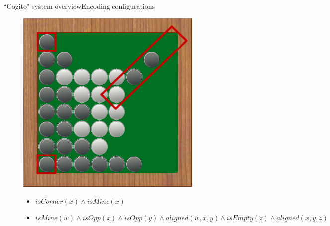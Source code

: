 \begin{frame}{``Cogito" system overview}{Encoding configurations}
\begin{figure}[ht]
  \begin{minipage}[t]{0.4\linewidth}
    \vspace{0pt}
    \centering
    \includegraphics[width=0.8\textwidth]{img/cogito/raisonneur_choix_2}	
  \end{minipage}
  \hfill
  \begin{minipage}[t]{0.55\textwidth}
    \vspace{0pt}
    \begin{itemize}
	\item $isCorner(x) \wedge isMine(x)$
	\item $isMine(w) \wedge isOpp(x) \wedge isOpp(y) 
		  \wedge aligned(w,x,y) \wedge isEmpty(z) 
		  \wedge aligned (x,y,z)$
    \end{itemize}
  \end{minipage}
\end{figure}

\end{frame}

